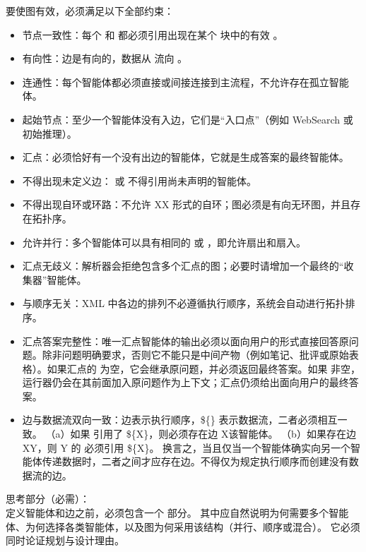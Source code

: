 \begin{userprompt}[title={用户提示词}]
要使图有效，必须满足以下全部约束：
\begin{itemize}[leftmargin=*,noitemsep,topsep=2pt]
\item 节点一致性：每个  和  都必须引用出现在某个  块中的有效 。
\item 有向性：边是有向的，数据从  流向 。
\item 连通性：每个智能体都必须直接或间接连接到主流程，不允许存在孤立智能体。
\item 起始节点：至少一个智能体没有入边，它们是“入口点”（例如 WebSearch 或初始推理）。
\item 汇点：必须恰好有一个没有出边的智能体，它就是生成答案的最终智能体。
\item 不得出现未定义边： 或  不得引用尚未声明的智能体。
\item 不得出现自环或环路：不允许 XX 形式的自环；图必须是有向无环图，并且存在拓扑序。
\item 允许并行：多个智能体可以具有相同的  或 ，即允许扇出和扇入。
\item 汇点无歧义：解析器会拒绝包含多个汇点的图；必要时请增加一个最终的“收集器”智能体。
\item 与顺序无关：XML 中各边的排列不必遵循执行顺序，系统会自动进行拓扑排序。
\item 汇点答案完整性：唯一汇点智能体的输出必须以面向用户的形式直接回答原问题。除非问题明确要求，否则它不能只是中间产物（例如笔记、批评或原始表格）。如果汇点的  为空，它会继承原问题，并必须返回最终答案。如果  非空，运行器仍会在其前面加入原问题作为上下文；汇点仍须给出面向用户的最终答案。
\item 边与数据流双向一致：边表示执行顺序，\$\{\} 表示数据流，二者必须相互一致。
    （a）如果  引用了 \$\{X\}，则必须存在边 X该智能体。
    （b）如果存在边 XY，则 Y 的  必须引用 \$\{X\}。
    换言之，当且仅当一个智能体确实向另一个智能体传递数据时，二者之间才应存在边。不得仅为规定执行顺序而创建没有数据流的边。
\end{itemize}

思考部分（必需）：\\

定义智能体和边之前，必须包含一个  部分。
其中应自然说明为何需要多个智能体、为何选择各类智能体，以及图为何采用该结构（并行、顺序或混合）。
它必须同时论证规划与设计理由。\\


\end{userprompt}

